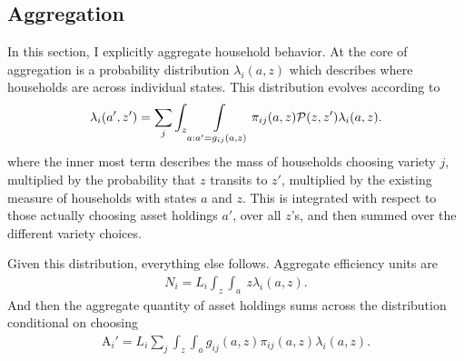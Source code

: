 \documentclass[12pt,pdftex]{article}
\begin{document}
\begin{onehalfspacing}
\subsection{Aggregation}

In this section, I explicitly aggregate household behavior. At the core of aggregation is a probability distribution $\lambda_{i}(a, z)$ which describes where households are across individual states. This distribution evolves according to
\begin{align}
\lambda_i(a', z') = \sum_{j} \int_{z}\int\displaylimits_{a: a' = g_{ij}(a, z)} \pi_{ij}(a, z) \mathcal{P}(z, z') \lambda_i(a, z).
\label{eq:law_motion}
\end{align}
where the inner most term describes the mass of households choosing variety $j$, multiplied by the probability that $z$ transits to $z'$, multiplied by the existing measure of households with states $a$ and $z$. This is integrated with respect to those actually choosing asset holdings $a'$, over all $z$'s, and then summed over the different variety choices.

Given this distribution, everything else follows. Aggregate efficiency units are
\begin{align}
N_i = L_{i}\int_{z} \int_{a}\ z \lambda_i(a, z). \label{eq:ag-labor-supply}
\end{align}
And then the aggregate quantity of asset holdings sums across the distribution conditional on choosing
\begin{align}
\mathrm{A}_i' = L_{i}\sum_{j} \int_{z} \int_{a}  g_{ij}(a, z) \pi_{ij}(a, z) \lambda_i(a, z).
\label{eq:aggregate_asset}
\end{align}


\end{onehalfspacing}
\end{document}
